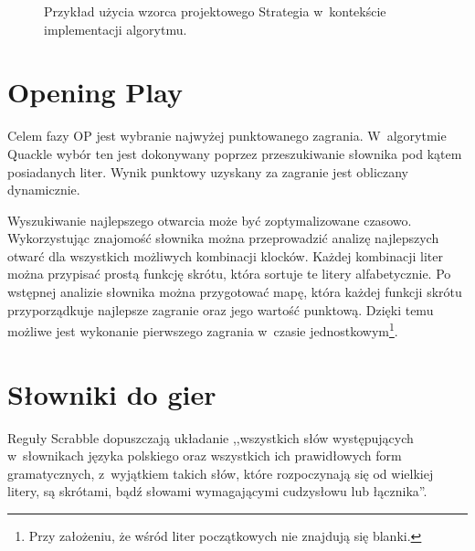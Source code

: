 \documentclass[a4paper,twocolumn,12pt]{article}
\theoremstyle{definition}
\begin{document}
\begin{figure}[ht!]
	\centering
	\caption{Przykład użycia wzorca projektowego Strategia w~kontekście implementacji algorytmu.}
	\label{fig:strategy_pattern}
\end{figure}

\section*{Opening Play}

Celem fazy OP jest wybranie najwyżej punktowanego zagrania. W~algorytmie Quackle wybór ten jest dokonywany poprzez przeszukiwanie słownika pod kątem posiadanych liter. Wynik punktowy uzyskany za zagranie jest obliczany dynamicznie. 

Wyszukiwanie najlepszego otwarcia może być zoptymalizowane czasowo. Wykorzystując znajomość słownika można przeprowadzić analizę najlepszych otwarć dla wszystkich możliwych kombinacji klocków. Każdej kombinacji liter można przypisać prostą funkcję skrótu, która sortuje te litery alfabetycznie. Po wstępnej analizie słownika można przygotować mapę, która każdej funkcji skrótu przyporządkuje najlepsze zagranie oraz jego wartość punktową. Dzięki temu możliwe jest wykonanie pierwszego zagrania w~czasie jednostkowym\footnote{Przy założeniu, że wśród liter początkowych nie znajdują się blanki.}.

\section*{Słowniki do gier}

Reguły Scrabble dopuszczają układanie ,,wszystkich słów występujących w~słownikach języka polskiego oraz wszystkich ich prawidłowych form gramatycznych, z~wyjątkiem takich słów, które rozpoczynają się od wielkiej litery, są skrótami, bądź słowami wymagającymi cudzysłowu lub łącznika''. \cite{scrabble_word_rules} 
\end{document}
